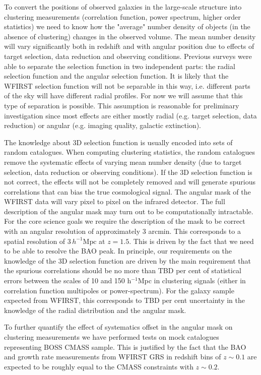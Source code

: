 To convert the positions of observed galaxies in the large-scale structure
 into clustering measurements (correlation function, power spectrum, higher order
 statistics) we need to know how the "average" number density of objects (in the
 absence of clustering) changes in the observed volume. The mean number density
 will vary significantly both in redshift and with angular position due to
 effects of target selection, data reduction and observing conditions. Previous
 surveys were able to separate the selection function in two independent parts:
 the radial selection function and the angular selection function. It is likely
 that the WFIRST selection function will not be separable in this way, i.e.
 different parts of the sky will have different radial profiles. For now we will
 assume that this type of separation is possible. This assumption is reasonable
 for preliminary investigation since most effects are either mostly radial (e.g.
 target selection, data reduction) or angular (e.g. imaging quality, galactic
 extinction).

 The knowledge about 3D selection function is usually encoded into sets of random
 catalogues. When computing clustering statistics, the random catalogues remove
 the systematic effects of varying mean number density (due to target selection,
 data reduction or observing conditions). If the 3D selection function is not
 correct, the effects will not be completely removed and will generate spurious
 correlations that can bias the true cosmological signal. The angular mask of the
 WFIRST data will vary pixel to pixel on the infrared detector. The full
 description of the angular mask may turn out to be computationally intractable.
 For the core science goals we require the description of the mask to be correct
 with an angular resolution of approximately 3 arcmin. This corresponds to a
 spatial resolution of $3 \,h^{-1} \mathrm{Mpc}$ at $z=1.5$. This is driven by the fact that we
 need to be  able to resolve the BAO peak. In principle, our requirements on the
 knowledge of the 3D selection function are driven by the main requirement that
 the spurious correlations should be no more than TBD per cent of statistical
 errors between the scales of 10 and 150 h$^{-1}$Mpc in clustering signals (either
 in correlation function multipoles or power-­spectrum). For the galaxy sample
 expected from WFIRST, this corresponds to TBD per cent uncertainty in the
 knowledge of the radial distribution and the angular mask.

 To further quantify the effect of systematics offset in the angular mask on
 clustering measurements we have performed tests on mock catalogues representing
 BOSS CMASS sample. This is justified by the fact that the BAO and growth rate
 measurements from WFIRST GRS in redshift bins of $z\sim0.1$ are expected to be
 roughly equal to the CMASS constraints with $z\sim0.2$.

